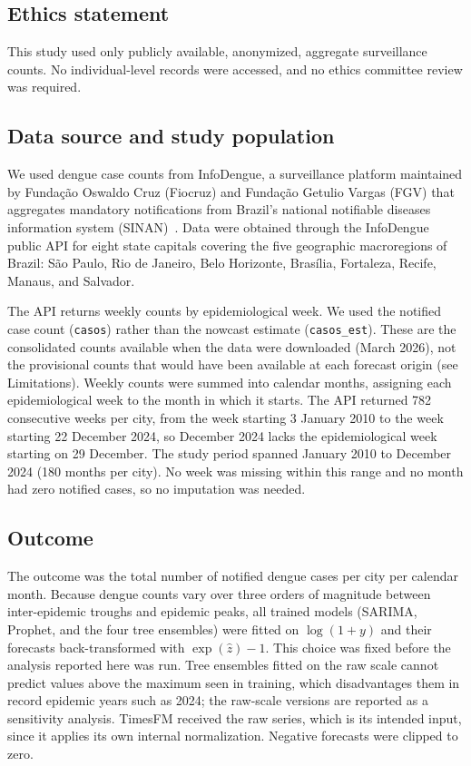 \documentclass[10pt,letterpaper]{article}
\begin{document}
\subsection*{Ethics statement}
This study used only publicly available, anonymized, aggregate surveillance counts. No individual-level records were accessed, and no ethics committee review was required.

\subsection*{Data source and study population}
We used dengue case counts from InfoDengue, a surveillance platform maintained by Funda\c{c}\~ao Oswaldo Cruz (Fiocruz) and Funda\c{c}\~ao Getulio Vargas (FGV) that aggregates mandatory notifications from Brazil's national notifiable diseases information system (SINAN)~\cite{Codeco2018infodengue}. Data were obtained through the InfoDengue public API for eight state capitals covering the five geographic macroregions of Brazil: S\~ao Paulo, Rio de Janeiro, Belo Horizonte, Bras\'ilia, Fortaleza, Recife, Manaus, and Salvador.

The API returns weekly counts by epidemiological week. We used the notified case count (\texttt{casos}) rather than the nowcast estimate (\texttt{casos\_est}). These are the consolidated counts available when the data were downloaded (March 2026), not the provisional counts that would have been available at each forecast origin (see Limitations). Weekly counts were summed into calendar months, assigning each epidemiological week to the month in which it starts. The API returned 782 consecutive weeks per city, from the week starting 3 January 2010 to the week starting 22 December 2024, so December 2024 lacks the epidemiological week starting on 29 December. The study period spanned January 2010 to December 2024 (180 months per city). No week was missing within this range and no month had zero notified cases, so no imputation was needed.

\subsection*{Outcome}
The outcome was the total number of notified dengue cases per city per calendar month. Because dengue counts vary over three orders of magnitude between inter-epidemic troughs and epidemic peaks, all trained models (SARIMA, Prophet, and the four tree ensembles) were fitted on $\log(1+y)$ and their forecasts back-transformed with $\exp(\hat{z})-1$. This choice was fixed before the analysis reported here was run. Tree ensembles fitted on the raw scale cannot predict values above the maximum seen in training, which disadvantages them in record epidemic years such as 2024; the raw-scale versions are reported as a sensitivity analysis. TimesFM received the raw series, which is its intended input, since it applies its own internal normalization. Negative forecasts were clipped to zero.
\end{document}

